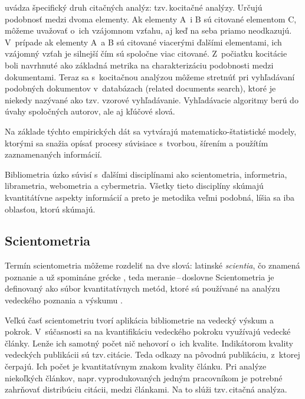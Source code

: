 \citet{Vavrikova2008} uvádza špecifický druh citačných analýz: tzv.\,kocitačné
analýzy.   Určujú podobnosť medzi dvoma elementy. Ak
elementy A~i B sú citované elementom C, môžeme uvažovať o~ich vzájomnom vzťahu,
aj keď na seba priamo neodkazujú. V~prípade ak elementy A~a B sú citované
viacerými ďalšími elementami, ich vzájomný vzťah je silnejší čím sú spoločne
viac citované. Z~počiatku kocitácie boli navrhnuté ako základná metrika na
charakterizáciu podobnosti medzi dokumentami. Teraz sa s~kocitačnou analýzou
môžeme stretnúť pri vyhľadávaní podobných dokumentov v~databázach (related
documents search), ktoré je niekedy nazývané ako  tzv.
vzorové vyhľadávanie. Vyhľadávacie algoritmy berú do úvahy spoločných autorov,
ale aj kľúčové slová.

Na základe týchto empirických dát sa vytvárajú matematicko-štatistické modely,
ktorými sa snažia opísať procesy súvisiace s~tvorbou, šírením a použítím
zaznamenaných informácií.

Bibliometria úzko súvisí s~ďalšími disciplínami ako scientometria, informetria,
librametria, webometria a cybermetria.  Všetky tieto disciplíny skúmajú
kvantitátívne aspekty informácií a preto je metodika veľmi podobná, líšia sa iba
oblasťou, ktorú skúmajú.


\subsection{Scientometria}

Termín scientometria môžeme rozdeliť na dve slová: latinské
\emph{scientia}, čo znamená poznanie a už
spomináne grécke , teda
meranie\,--\,doslovne  Scientometria je
definovaný ako súbor kvantitatívnych metód, ktoré sú používané na
    analýzu vedeckého poznania a výskumu \citep{Hood2001}.

Veľkú časť scientometriu tvorí aplikácia bibliometrie na vedecký výskum a
pokrok.  V~súčasnosti sa na kvantifikáciu vedeckého pokroku využívajú vedecké
články.  Lenže ich samotný počet nič nehovorí o~ich kvalite.  Indikátorom
kvality vedeckých publikácii sú tzv.\,citácie.  Teda odkazy na pôvodnú
publikáciu, z~ktorej čerpajú.  Ich počet je kvantitatívnym znakom kvality
článku.  Pri analýze niekoľkých článkov, napr.\,vyprodukovaných jedným
pracovníkom je potrebné zahrňovať distribúciu citácii, medzi článkami.  Na to
slúži tzv.\,citačná analýza.

